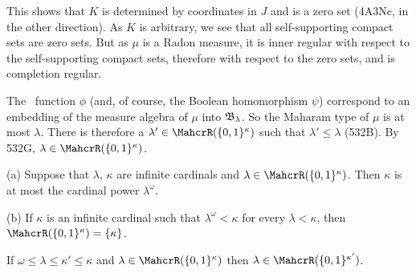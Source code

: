 {This shows that $K$ is determined by coordinates in $J$ and is a zero
set (4A3Nc, in the other direction).
As $K$ is arbitrary, we see that all self-supporting compact sets
are zero sets.   But as $\mu$ is a Radon measure, it is inner regular
with respect to the self-supporting compact sets, therefore with respect
to the zero sets, and is completion regular.\ \Qed

The \imp\ function $\phi$ (and, of course, the Boolean homomorphism
$\psi$) correspond to an embedding of the measure algebra
of $\mu$ into
$\frak B_{\lambda}$.   So the Maharam type of $\mu$ is at most
$\lambda$.
There is therefore a $\lambda'\in\MahcrR(\{0,1\}^{\kappa})$ such
that $\lambda'\le\lambda$ (532B).   By 532G,
$\lambda\in\MahcrR(\{0,1\}^{\kappa})$.
}%

(a) Suppose that $\lambda$, $\kappa$ are infinite cardinals and
$\lambda\in\MahcrR(\{0,1\}^{\kappa})$.   Then
$\kappa$ is at most the cardinal power $\lambda^{\omega}$.

(b) If $\kappa$ is an infinite cardinal such that
$\lambda^{\omega}<\kappa$ for every $\lambda<\kappa$, then $\MahcrR(\{0,1\}^{\kappa})=\{\kappa\}$.


 If $\omega\le\lambda\le\kappa'\le\kappa$ and
$\lambda\in\MahcrR(\{0,1\}^{\kappa})$ then
$\lambda\in\MahcrR(\{0,1\}^{\kappa'})$.


